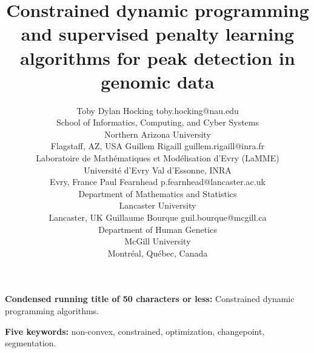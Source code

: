 \documentclass[twoside,11pt]{article}
\begin{document}
\title{Constrained dynamic programming and supervised
penalty learning algorithms for 
peak detection in genomic data}

\author{%
  \name Toby Dylan Hocking \email toby.hocking@nau.edu \\%
  \addr School of Informatics, Computing, and Cyber Systems\\
  Northern Arizona University\\
  Flagstaff, AZ, USA
  \AND
  \name Guillem Rigaill \email guillem.rigaill@inra.fr \\%
  \addr Laboratoire de Math\'ematiques et Mod\'elisation d'Evry (LaMME)\\
  Universit\'e d'Evry Val d'Essonne, INRA\\
  Evry, France
  \AND
  \name Paul Fearnhead \email p.fearnhead@lancaster.ac.uk \\%
  \addr Department of Mathematics and Statistics\\
  Lancaster University\\
  Lancaster, UK
  \AND
  \name Guillaume Bourque \email guil.bourque@mcgill.ca\\%
  \addr Department of Human Genetics\\
  McGill University\\
  Montr\'eal, Qu\'ebec, Canada}


\textbf{Condensed running title of 50 characters or less:} 
Constrained dynamic programming algorithms.

\textbf{Five keywords:} non-convex, constrained, optimization, changepoint, segmentation.



\maketitle
\end{document}
